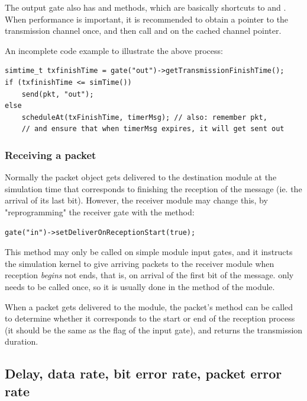 The output gate also has  and 
methods, which are basically shortcuts to 
and . When performance
is important, it is recommended to obtain a pointer to the transmission
channel once, and then call  and 
on the cached channel pointer.

An incomplete code example to illustrate the above process:

\begin{verbatim}
simtime_t txfinishTime = gate("out")->getTransmissionFinishTime();
if (txfinishTime <= simTime())
    send(pkt, "out");
else
    scheduleAt(txFinishTime, timerMsg); // also: remember pkt,
    // and ensure that when timerMsg expires, it will get sent out
\end{verbatim}


\subsubsection{Receiving a packet}

Normally the packet object gets delivered to the destination module
at the simulation time that corresponds to finishing the reception
of the message (ie. the arrival of its last bit). However, the receiver
module may change this, by "reprogramming" the receiver gate with
the  method:

\begin{verbatim}
gate("in")->setDeliverOnReceptionStart(true);
\end{verbatim}

This method may only be called on simple module input gates, and it
instructs the simulation kernel to give arriving packets to the
receiver module when reception \textit{begins} not ends, that is,
on arrival of the first bit of the message.
 only needs to be called once,
so it is usually done in the  method of the module.

When a packet gets delivered to the module, the packet's
 method can be called to determine
whether it corresponds to the start or end of the reception
process (it should be the same as the 
flag of the input gate), and  returns the transmission
duration.


\subsection{Delay, data rate, bit error rate, packet error rate}

